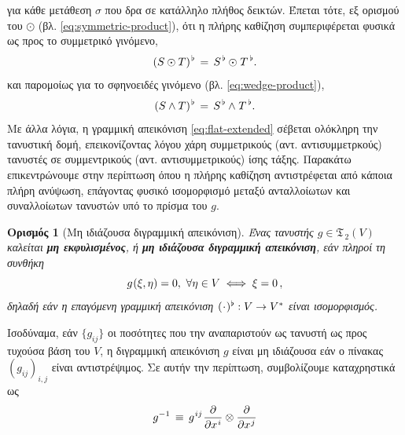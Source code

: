 \documentclass[11pt,a4paper,twoside,openright]{book}
\newtheorem{definition}[lemma]{Ορισμός}
\begin{document}
για κάθε μετάθεση $\sigma$ που δρα σε κατάλληλο πλήθος δεικτών.
Έπεται τότε, εξ ορισμού του $\odot$ (βλ. \eqref{eq:symmetric-product}), ότι η πλήρης καθίζηση συμπεριφέρεται φυσικά ως προς το συμμετρικό γινόμενο,
\begin{equation}\label{eq:flat-extended-symmetric-product-naturality}
(S \odot T)^{\hspace{.75pt}\flat}\,=\,S^{\hspace{1pt}\flat} \odot \hspace{.5pt} T^{\,\flat}.
\end{equation}
και παρομοίως για το σφηνοειδές γινόμενο
(βλ. \eqref{eq:wedge-product}),
\begin{equation}\label{eq:flat-extended-wedge-product-naturality}
(S \wedge T)^{\hspace{.75pt}\flat}\,=\,S^{\hspace{1pt}\flat} \wedge\hspace{.5pt} T^{\,\flat}.
\end{equation}
Με άλλα λόγια, η γραμμική απεικόνιση \eqref{eq:flat-extended}
σέβεται ολόκληρη την τανυστική δομή, επεικονίζοντας λόγου χάρη συμμετρικούς (αντ. αντισυμμετρκούς) τανυστές σε συμμεντρικούς (αντ. αντισυμμετρικούς) ίσης τάξης. Παρακάτω επικεντρώνουμε στην περίπτωση όπου η πλήρης καθίζηση αντιστρέφεται από κάποια πλήρη ανύψωση, επάγοντας φυσικό ισομορφισμό μεταξύ ανταλλοίωτων και συναλλοίωτων τανυστών υπό το πρίσμα του $g$.
\begin{definition}[Μη ιδιάζουσα διγραμμική απεικόνιση]
	\label{def:non-singular-bilinear-map}
Ένας τανυστής $g \in \mathfrak{T}_{\,2}(V)$
καλείται \textbf{μη εκφυλισμένος}, ή \textbf{μη ιδιάζουσα διγραμμική απεικόνιση}, εάν πληροί τη συνθήκη
\begin{equation}\label{eq:non-singular-bilinear-map}
g\hspace{.5pt}(\xi, \eta) = 0,
\,\,
\forall \eta \in V
\iff
\xi = 0\,,
\end{equation}
δηλαδή εάν η επαγόμενη γραμμική απεικόνιση $\hspace{.5pt}(\hspace{.5pt}\cdot\hspace{.5pt})^\flat: V \to V^*$ είναι ισομορφισμός.
\end{definition}
\noindent
Ισοδύναμα, εάν $\{g_{ij}\}$ οι ποσότητες που την αναπαριστούν ως τανυστή ως προς τυχούσα βάση του $V$, η διγραμμική απεικόνιση $g$ είναι μη ιδιάζουσα εάν ο πίνακας $(g_{ij})_{i,j}$  είναι αντιστρέψιμος. Σε αυτήν την περίπτωση, συμβολίζουμε καταχρηστικά ως
\begin{equation}
g^{-1}
\,\equiv\,
g^{\hspace{.5pt}ij}\hspace{.5pt}\frac{\partial}{\partial x^{\hspace{.5pt}i}} \otimes \frac{\partial}{\partial x^{\hspace{.5pt}j}}
\end{equation}
\end{document}
